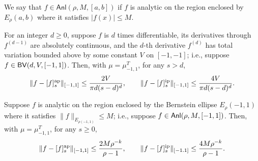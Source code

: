 \begin{definition}
    We say that \( f\in \mathsf{Anl}(\rho,M,[a,b]) \) if \( f \) is analytic on the region enclosed by \( E_\rho(a,b) \) where it satisfies \( |f(x)|\leq M \).
\end{definition}

\begin{theorem}
    \label{thm:bv_cheb}
    For an integer \( d \geq 0 \), suppose \( f \) is \( d \) times differentiable, its derivatives through \( f^{(d-1)} \) are absolutely continuous, and the \( d \)-th derivative \( f^{(d)} \) has total variation bounded above by some constant \( V \) on \( [-1,-1] \); i.e., suppose \( f \in \textup{\textsf{BV}}(d,V,[-1,1]) \).
    Then, with \( \mu = \mu_{-1,1}^T \), for any \( s > d \), 
    \begin{equation*}
        \| f - \ff[a]{f}{s} \|_{[-1,1]} \leq \frac{2 V}{\pi d(s-d)^d}
        ,\qquad
        \| f - \ff[i]{f}{s} \|_{[-1,1]} \leq \frac{4 V}{\pi d(s-d)^d}.
    \end{equation*}
\end{theorem}

\begin{theorem}
    \label{thm:analytic_cheb}
    Suppose \( f \) is analytic on the region enclosed by the Bernstein ellipse \( E_\rho(-1,1) \) where it satisfies \( \|f\|_{E_{\rho(-1,1)}} \leq M \); i.e., suppose \( f\in \textup{\textsf{Anl}}(\rho,M,[-1,1]) \).
    Then, with \( \mu = \mu_{-1,1}^T \), for any \( s \geq 0 \), 
    \begin{equation*}
        \| f - \ff[a]{f}{s} \|_{[-1,1]} \leq \frac{2 M \rho^{-k}}{\rho - 1}
        ,\qquad
        \| f - \ff[i]{f}{s} \|_{[-1.1]} \leq \frac{4 M \rho^{-k}}{\rho - 1}.
    \end{equation*}
\end{theorem}

